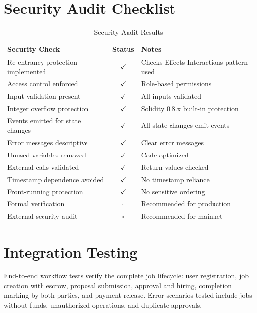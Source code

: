 \section{Security Audit Checklist}

\begin{table}[H]
\centering
\caption{Security Audit Results}
\begin{tabular}{|p{6cm}|c|p{5cm}|}
\hline
\textbf{Security Check} & \textbf{Status} & \textbf{Notes} \\
\hline
Re-entrancy protection implemented & $\checkmark$ & Checks-Effects-Interactions pattern used \\
\hline
Access control enforced & $\checkmark$ & Role-based permissions \\
\hline
Input validation present & $\checkmark$ & All inputs validated \\
\hline
Integer overflow protection & $\checkmark$ & Solidity 0.8.x built-in protection \\
\hline
Events emitted for state changes & $\checkmark$ & All state changes emit events \\
\hline
Error messages descriptive & $\checkmark$ & Clear error messages \\
\hline
Unused variables removed & $\checkmark$ & Code optimized \\
\hline
External calls validated & $\checkmark$ & Return values checked \\
\hline
Timestamp dependence avoided & $\checkmark$ & No timestamp reliance \\
\hline
Front-running protection & $\checkmark$ & No sensitive ordering \\
\hline
Formal verification & $\square$ & Recommended for production \\
\hline
External security audit & $\square$ & Recommended for mainnet \\
\hline
\end{tabular}
\end{table}

\section{Integration Testing}

End-to-end workflow tests verify the complete job lifecycle: user registration, job creation with escrow, proposal submission, approval and hiring, completion marking by both parties, and payment release. Error scenarios tested include jobs without funds, unauthorized operations, and duplicate approvals.

